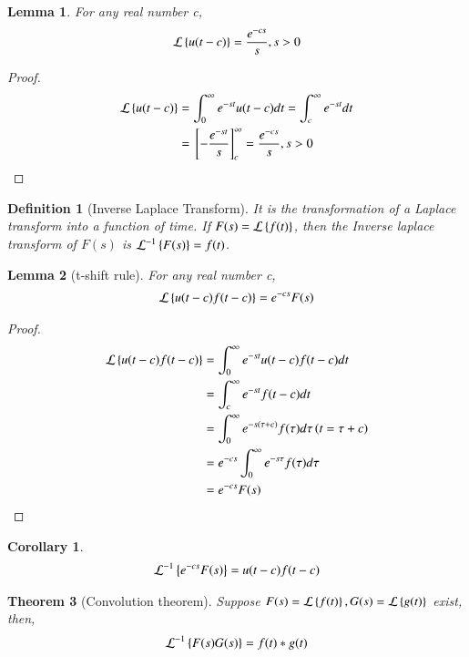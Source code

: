 \documentclass[journal,12pt,twocolumn]{IEEEtran}
\newtheorem{theorem}{Theorem}[section]
\newtheorem{corollary}{Corollary}[theorem]
\newtheorem{lemma}[theorem]{Lemma}
\newtheorem{definition}{Definition}[section]
\begin{document}
\begin{lemma}
For any real number c, 
\begin{align}
    \mathcal{L}\left\{u(t-c)\right\}=\dfrac{e^{-cs}}{s}, s>0
    \label{eq:u}
\end{align}
\end{lemma}
\begin{proof}
 \begin{align}
     \mathcal{L}\left\{u(t-c)\right\}&=\int_{0}^{\infty}e^{-st}u(t-c)dt=\int_{c}^{\infty}e^{-st}dt\\
     &={}\left[-\dfrac{e^{-st}}{s}\right]_{c}^{\infty}=\dfrac{e^{-cs}}{s}, s>0
 \end{align}
\end{proof}
\begin{definition}[Inverse Laplace Transform]
It is the transformation of a Laplace transform into a function of time. If $F(s)=\mathcal{L}\left\{f(t)\right\}$, then the Inverse laplace transform of $F(s)$ is $\mathcal{L}^{-1}\left\{F(s)\right\}=f(t)$.
\end{definition}
\begin{lemma}[t-shift rule]
For any real number c,
\begin{align}
    \mathcal{L}\left\{u(t-c)f(t-c)\right\}=e^{-cs}F(s)
    \label{eq:uf}
\end{align}
\end{lemma}
\begin{proof}
\begin{align}
    \mathcal{L}\left\{u(t-c)f(t-c)\right\}&=\int_{0}^{\infty}e^{-st}u(t-c)f(t-c)dt\\
    &=\int_{c}^{\infty}e^{-st}f(t-c)dt\\
    &=\int_{0}^{\infty}e^{-s(\tau+c)}f(\tau)d\tau \left(t=\tau+c\right)\\
    &=e^{-cs}\int_{0}^{\infty}e^{-s\tau}f(\tau)d\tau\\
    &=e^{-cs}F(s)
\end{align}
\end{proof}
\begin{corollary}
\begin{align}
    \mathcal{L}^{-1}\left\{e^{-cs}F(s)\right\}=u(t-c)f(t-c)
\end{align}
\end{corollary}
\begin{theorem}[Convolution theorem]
Suppose $F(s)=\mathcal{L}\left\{f(t)\right\}, G(s)=\mathcal{L}\left\{g(t)\right\}$ exist, then,
\begin{align}
    \mathcal{L}^{-1}\left\{F(s)G(s)\right\}=f(t)*g(t)\label{eq:cuf}
\end{align}
\end{theorem}
\end{document}
